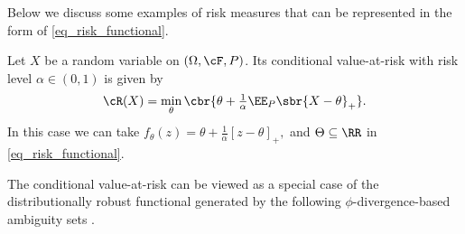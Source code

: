 \documentclass[9pt]{article}
\numberwithin{equation}{section}
\renewcommand{\frac}[2]{\tfrac{#1}{#2}}
\begin{document}
Below we discuss some examples of risk measures that can be represented in the form of \eqref{eq_risk_functional}.

\begin{example}\label{example_cvar}
    Let $X$ be a random variable on $(\Omega, \cF, P)$. Its conditional value-at-risk with risk level $\alpha \in (0,1)$ is given by 
    \begin{align*}
     \cR(X) = \min_{\theta}  \cbr{ \theta + \frac{1}{\alpha} \EE_P \sbr{X - \theta}_+ }.
    \end{align*}
    In this case we can take
$
        f_\theta(z) = \theta + \frac{1}{\alpha} [z - \theta]_+,
$
    and $\Theta \subseteq \RR$ in \eqref{eq_risk_functional}.
\end{example}

The conditional value-at-risk can be viewed as a special case of the distributionally robust functional generated by the following  $\phi$-divergence-based ambiguity sets \cite{shapiro2017distributionally}.
\end{document}
